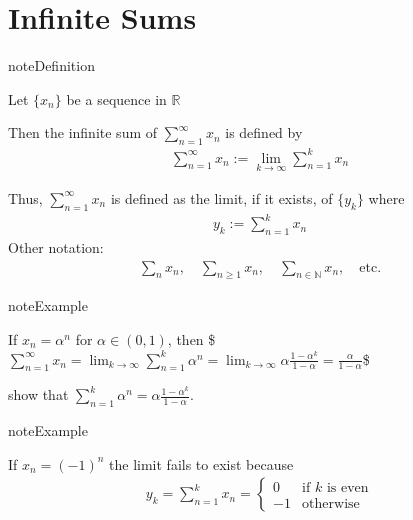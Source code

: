 \documentclass[letterpaper,10pt,english]{jupyterBook}
\begin{document}
\section{Infinite Sums}
\label{\detokenize{04.basic_analysis:infinite-sums}}
\begin{sphinxadmonition}{note}{Definition}

\sphinxAtStartPar
Let \(\{x_n\}\) be a sequence in \(\mathbb{R}\)

\sphinxAtStartPar
Then the infinite sum of \(\sum_{n=1}^{\infty} x_n\) is defined by
\begin{equation*}
\begin{split}
\sum_{n=1}^{\infty} x_n := \lim_{k\to \infty} \sum_{n=1}^k x_n  
\end{split}
\end{equation*}\end{sphinxadmonition}

\sphinxAtStartPar
Thus, \(\sum_{n=1}^{\infty} x_n\) is defined as the limit, if it exists,
of \(\{y_k\}\) where
\begin{equation*}
\begin{split}
y_k :=  \sum_{n=1}^k x_n  
\end{split}
\end{equation*}
\sphinxAtStartPar
Other notation:
\begin{equation*}
\begin{split}
\sum_n x_n, 
\quad \sum_{n \geq 1} x_n,
\quad \sum_{n \in \mathbb{N}} x_n,
\quad \text{etc.}
\end{split}
\end{equation*}
\begin{sphinxadmonition}{note}{Example}

\sphinxAtStartPar
If \(x_n = \alpha^n\) for \(\alpha \in (0, 1)\), then
\$\(
\sum_{n=1}^{\infty} x_n 
= \lim_{k\to \infty} \sum_{n=1}^k \alpha^n
= \lim_{k\to \infty} \alpha \frac{1 - \alpha^k}{1 - \alpha}
=  \frac{\alpha}{1 - \alpha}
\)\$
\end{sphinxadmonition}

\sphinxAtStartPar
{} show that \(\sum_{n=1}^k \alpha^n
= \alpha \frac{1 - \alpha^k}{1 - \alpha}\).

\begin{sphinxadmonition}{note}{Example}

\sphinxAtStartPar
If \(x_n = (-1)^n\) the limit fails to exist because
\begin{equation*}
\begin{split}
y_k 
= \sum_{n=1}^k x_n
=
\begin{cases}
0 & \text{if $k$ is even}    
\\
-1 & \text{otherwise}
\end{cases}
\end{split}
\end{equation*}\end{sphinxadmonition}
\end{document}
